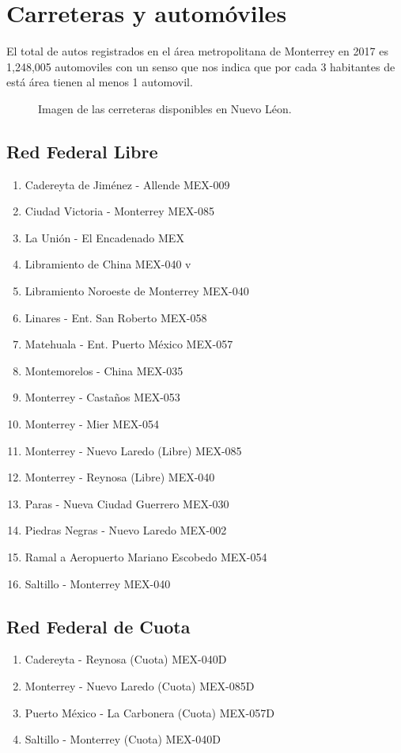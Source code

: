 \documentclass[a4paper]{article}
\begin{document}
\autocite{MasInegi}

\section{Carreteras y automóviles}
El total  de autos registrados en  el área metropolitana de Monterrey en 2017  es 1,248,005 automoviles con un senso que nos indica que por  cada 3 habitantes de está área tienen al menos 1 automovil.
\autocite{SCT}

\begin{figure}[H]
    \centering

    \caption{Imagen de las cerreteras disponibles en Nuevo Léon.\\\autocite{SCT}}
    \label{fig:Carreteras}
\end{figure}

\subsection{Red Federal Libre}
\begin{enumerate}
\item Cadereyta de Jiménez - Allende MEX-009 
\item Ciudad Victoria - Monterrey MEX-085
\item La Unión - El Encadenado MEX 
\item Libramiento de China MEX-040 v
\item Libramiento Noroeste de Monterrey MEX-040 
\item Linares - Ent. San Roberto MEX-058
\item Matehuala - Ent. Puerto México MEX-057
\item Montemorelos - China MEX-035
\item Monterrey - Castaños MEX-053
\item Monterrey - Mier MEX-054 
\item Monterrey - Nuevo Laredo (Libre) MEX-085
\item Monterrey - Reynosa (Libre) MEX-040 
\item Paras - Nueva Ciudad Guerrero MEX-030 
\item Piedras Negras - Nuevo Laredo MEX-002 
\item Ramal a Aeropuerto Mariano Escobedo MEX-054
\item Saltillo - Monterrey MEX-040
\end{enumerate}
\autocite{SCT}


\subsection{Red Federal de Cuota}
\begin{enumerate}
\item Cadereyta - Reynosa (Cuota) MEX-040D
\item Monterrey - Nuevo Laredo (Cuota) MEX-085D
\item Puerto México - La Carbonera (Cuota) MEX-057D
\item Saltillo - Monterrey (Cuota) MEX-040D 
\end{enumerate}
\autocite{SCT}
\end{document}
